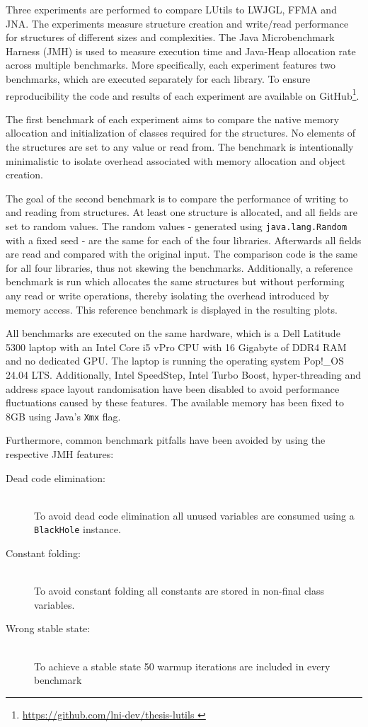 Three experiments are performed to compare LUtils to LWJGL, FFMA and JNA\@.
The experiments measure structure creation and write/read performance for structures of different sizes and complexities.
The Java Microbenchmark Harness (JMH) is used to measure execution time and Java-Heap allocation rate across multiple benchmarks.
More specifically, each experiment features two benchmarks, which are executed separately for each library.
To ensure reproducibility the code and results of each experiment are available on GitHub\footnote{
    \url{
        https://github.com/lni-dev/thesis-lutils
    }
}.

The first benchmark of each experiment aims to compare the native memory allocation and initialization of classes
required for the structures.
No elements of the structures are set to any value or read from.
The benchmark is intentionally minimalistic to isolate overhead associated with memory allocation and object creation.

The goal of the second benchmark is to compare the performance of writing to and reading from structures.
At least one structure is allocated, and all fields are set to random values.
The random values - generated using \texttt{java.lang.Random} with a fixed seed - are the same for each of the four libraries.
Afterwards all fields are read and compared with the original input.
The comparison code is the same for all four libraries, thus not skewing the benchmarks.
Additionally, a reference benchmark is run which allocates the same structures but without performing any read or write
operations, thereby isolating the overhead introduced by memory access.
This reference benchmark is displayed in the resulting plots.

All benchmarks are executed on the same hardware, which is a Dell Latitude 5300 laptop with an Intel Core i5 vPro CPU
with 16 Gigabyte of DDR4 RAM and no dedicated GPU. The laptop is running the operating system Pop!\_OS 24.04 LTS\@.
Additionally, Intel SpeedStep, Intel Turbo Boost, hyper-threading and address space layout randomisation have been disabled
to avoid performance fluctuations caused by these features\cite{disable_cpu_features}.
The available memory has been fixed to 8GB using Java’s \texttt{Xmx} flag.

Furthermore, common benchmark pitfalls\cite{benchmark_pitfalls_1, benchmark_pitfalls_2} have been avoided by using the
respective JMH features:
\begin{description}
    \item[Dead code elimination:] \hfill \\ To avoid dead code elimination all unused variables are consumed using a \texttt{BlackHole} instance.
    \item[Constant folding:] \hfill \\ To avoid constant folding all constants are stored in non-final class variables.
    \item[Wrong stable state:] \hfill \\ To achieve a stable state 50 warmup iterations are included in every benchmark
\end{description}

